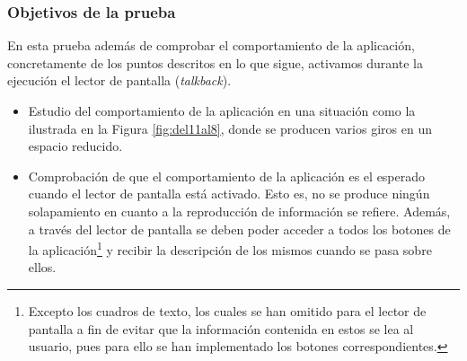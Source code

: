 \subsubsection*{Objetivos de la prueba}

En esta prueba además de comprobar el comportamiento de la aplicación, concretamente de los puntos descritos en lo que sigue, activamos durante la ejecución el lector de pantalla (\textit{talkback}). 

\begin{itemize}
	\item Estudio del comportamiento de la aplicación en una situación como la ilustrada en la Figura \ref{fig:del11al8}, donde se producen varios giros en un espacio reducido. 
	
	\item Comprobación de que el comportamiento de la aplicación es el esperado cuando el lector de pantalla está activado. Esto es, no se produce ningún solapamiento en cuanto a la reproducción de información se refiere. Además, a través del lector de pantalla se deben poder acceder a todos los botones de la aplicación\footnote{Excepto los cuadros de texto, los cuales se han omitido para el lector de pantalla a fin de evitar que la información contenida en estos se lea al usuario, pues para ello se han implementado los botones correspondientes.} y recibir la descripción de los mismos cuando se pasa sobre ellos. 
\end{itemize}

